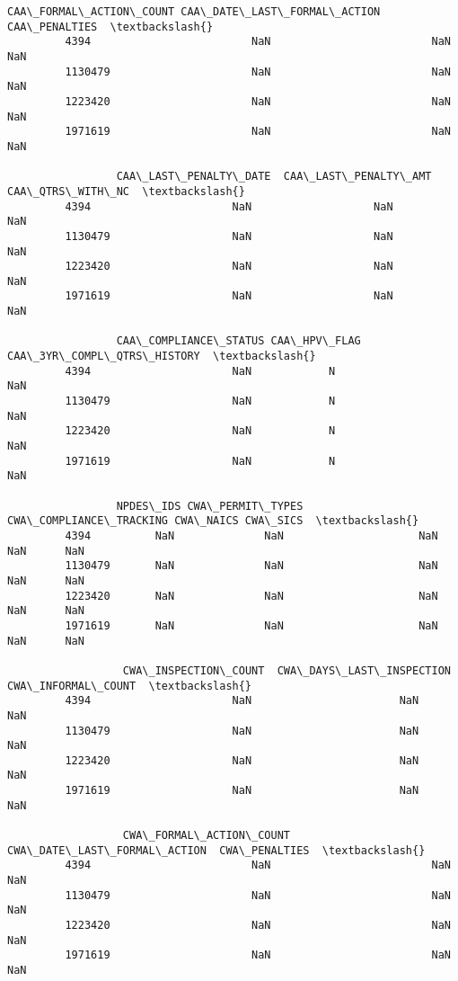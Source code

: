 \documentclass[11pt]{article}
\begin{document}
\begin{Verbatim}[commandchars=\\\{\}]
                  CAA\_FORMAL\_ACTION\_COUNT CAA\_DATE\_LAST\_FORMAL\_ACTION  CAA\_PENALTIES  \textbackslash{}
         4394                         NaN                         NaN            NaN   
         1130479                      NaN                         NaN            NaN   
         1223420                      NaN                         NaN            NaN   
         1971619                      NaN                         NaN            NaN   
         
                 CAA\_LAST\_PENALTY\_DATE  CAA\_LAST\_PENALTY\_AMT  CAA\_QTRS\_WITH\_NC  \textbackslash{}
         4394                      NaN                   NaN               NaN   
         1130479                   NaN                   NaN               NaN   
         1223420                   NaN                   NaN               NaN   
         1971619                   NaN                   NaN               NaN   
         
                 CAA\_COMPLIANCE\_STATUS CAA\_HPV\_FLAG CAA\_3YR\_COMPL\_QTRS\_HISTORY  \textbackslash{}
         4394                      NaN            N                        NaN   
         1130479                   NaN            N                        NaN   
         1223420                   NaN            N                        NaN   
         1971619                   NaN            N                        NaN   
         
                 NPDES\_IDS CWA\_PERMIT\_TYPES CWA\_COMPLIANCE\_TRACKING CWA\_NAICS CWA\_SICS  \textbackslash{}
         4394          NaN              NaN                     NaN       NaN      NaN   
         1130479       NaN              NaN                     NaN       NaN      NaN   
         1223420       NaN              NaN                     NaN       NaN      NaN   
         1971619       NaN              NaN                     NaN       NaN      NaN   
         
                  CWA\_INSPECTION\_COUNT  CWA\_DAYS\_LAST\_INSPECTION  CWA\_INFORMAL\_COUNT  \textbackslash{}
         4394                      NaN                       NaN                 NaN   
         1130479                   NaN                       NaN                 NaN   
         1223420                   NaN                       NaN                 NaN   
         1971619                   NaN                       NaN                 NaN   
         
                  CWA\_FORMAL\_ACTION\_COUNT CWA\_DATE\_LAST\_FORMAL\_ACTION  CWA\_PENALTIES  \textbackslash{}
         4394                         NaN                         NaN            NaN   
         1130479                      NaN                         NaN            NaN   
         1223420                      NaN                         NaN            NaN   
         1971619                      NaN                         NaN            NaN   
         

\end{Verbatim}
\end{document}
